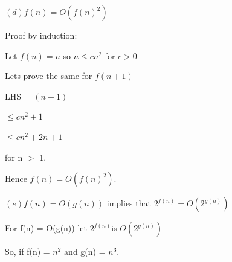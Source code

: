 \documentclass[letterpaper,portrait,12pt]{article}
\begin{document}
\begin{flushleft}
$(d) f (n) = O(f (n)^2 )$
\end{flushleft}


\begin{flushleft}
Proof by induction:
\end{flushleft}


\begin{flushleft}
Let $f(n)=n$ so $n \le cn^2$ for $c \gt 0$
\end{flushleft}


\begin{flushleft}

\end{flushleft}


\begin{flushleft}
Lets prove the same for $f(n+1)$
\end{flushleft}


\begin{flushleft}
LHS 	= $(n+1)$
\end{flushleft}


\begin{flushleft}
	$\le cn^2+1$
\end{flushleft}


\begin{flushleft}
	$\le cn^2+2n+1$
\end{flushleft}


\begin{flushleft}
	for n $>$ 1.
\end{flushleft}


\begin{flushleft}
Hence $f (n) = O(f (n)^2 )$.
\end{flushleft}


\begin{flushleft}

\end{flushleft}


\begin{flushleft}
$(e) f (n) = O(g(n))$ implies that $2^{f (n)} = O(2^{g(n)} )$
\end{flushleft}


\begin{flushleft}
For f(n) = O(g(n)) let $2^{f(n)}$is $O(2^{g(n)})$
\end{flushleft}


\begin{flushleft}
So, if f(n) = $n^2$ and g(n) = $n^3$.
\end{flushleft}
\end{document}
